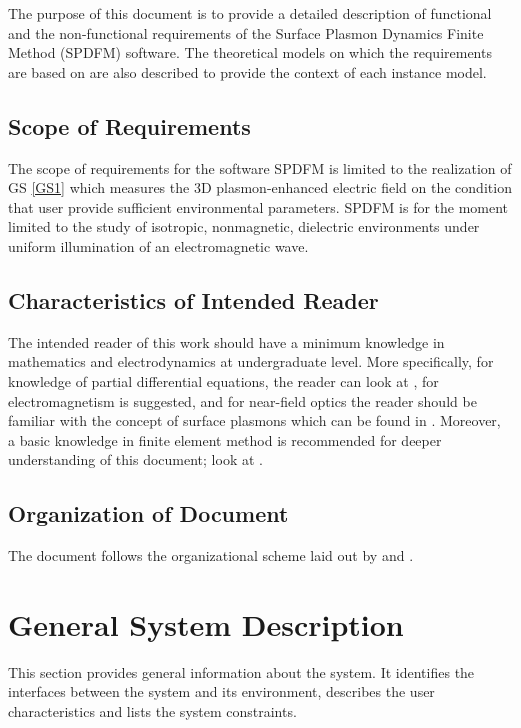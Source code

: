 \documentclass[12pt]{article}
\begin{document}
The purpose of this document is to provide a detailed description of functional and the non-functional requirements of the Surface Plasmon Dynamics Finite Method (SPDFM) software. The theoretical models on which the requirements are based on are also described to provide the context of each instance model.

\subsection{Scope of Requirements} 

The scope of requirements for the software SPDFM is limited to the realization of GS \ref{GS1} which measures the 3D plasmon-enhanced electric field on the condition that user provide sufficient environmental parameters. SPDFM is for the moment limited to the study of isotropic, nonmagnetic, dielectric environments under uniform illumination of an electromagnetic wave. 

\subsection{Characteristics of Intended Reader} \label{sec_IntendedReader}
The intended reader of this work should have a minimum knowledge in mathematics and electrodynamics at undergraduate level. More specifically, for knowledge of 
partial differential equations, the reader can look at  \cite{boyce2012elementary}, for electromagnetism  \cite{griffiths1962introduction} is suggested, and for near-field optics the reader should be familiar with the concept of surface plasmons  which can be found in \cite{maier2007plasmonics}. Moreover, a basic knowledge in finite element method is recommended for deeper understanding of this document; look at \cite{monk2003finite}.


\subsection{Organization of Document}

The document follows the organizational scheme laid out by \cite{SmithAndLai2005} and  \cite{SmithEtAl2007}. 


\section{General System Description}

This section provides general information about the system.  It identifies the
interfaces between the system and its environment, describes the user
characteristics and lists the system constraints.  
\end{document}
